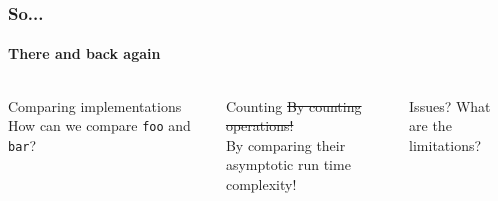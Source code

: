 \begin{frame}
	\frametitle{So...}
	\framesubtitle{There and back again}

	\begin{columns}
			
			
		\begin{questionblock}{Comparing implementations}
			How can we compare \texttt{foo} and \texttt{bar}?
		\end{questionblock}
		\begin{answerblock}{Counting}
			\st{By counting operations!}\\
			\pause
			By comparing their asymptotic run time complexity!
		\end{answerblock}
		\begin{problemblock}{Issues?}
			What are the limitations?
		\end{problemblock}
	\end{columns}
\end{frame}


